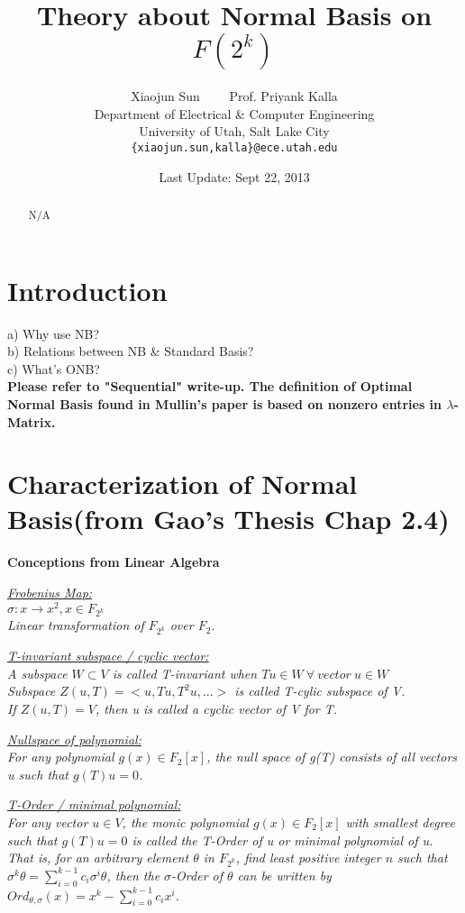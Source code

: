 \documentclass[12pt]{article}
\title{Theory about Normal Basis on $F(2^k)$}
\author{Xiaojun Sun \ \ \ \ Prof. Priyank Kalla\\
\small Department of Electrical \& Computer Engineering\\[-0.8ex]
\small University of Utah, Salt Lake City\\
\small \texttt{\{xiaojun.sun,kalla\}@ece.utah.edu}
}
\date{Last Update: Sept 22, 2013}
\begin{document}
\maketitle

\begin{abstract}
N/A
\end{abstract}

\section{Introduction}

a) Why use NB?\\
b) Relations between NB \& Standard Basis?\\
c) What's ONB?\\
{\bf Please refer to "Sequential" write-up. The definition of Optimal 
Normal Basis found in Mullin's paper is based on nonzero entries in $\lambda$-Matrix.}

\section{Characterization of Normal Basis(from Gao's Thesis Chap 2.4)}
\textbf{Conceptions from Linear Algebra}


\textit{\underline{Frobenius Map:} \\
$\sigma : x \rightarrow x^2, x \in F_{2^k}$ \\
Linear transformation of $F_{2^k}$ over $F_2$. \\
}

\textit{\underline{T-invariant subspace / cyclic vector:} \\
A subspace $W \subset V$ is called T-invariant when $Tu \in W \ \forall \ vector \ u \in W$\\
Subspace $Z(u,T) = <u,Tu,T^2u,...>$ is called T-cylic subspace of V. \\
If $Z(u,T) = V$, then u is called a cyclic vector of V for T.\\
}

\textit{\underline{Nullspace of polynomial:} \\
For any polynomial $g(x) \in F_2[x]$, the null space of g(T) consists of all vectors u such that
$g(T)u = 0$.\\
}

\textit{\underline{T-Order / minimal polynomial:} \\
For any vector $u \in V$, the monic polynomial $g(x) \in F_2[x]$ with smallest degree such that
$g(T)u = 0$ is called the T-Order of u or minimal polynomial of u.\\
That is, for an arbitrary element $\theta$ in $F_{2^k}$, find least positive integer $n$ such that
$\sigma^k\theta = \sum_{i=0}^{k-1} c_i\sigma^i\theta$, then the $\sigma$-Order of $\theta$ can be 
written by $Ord_{\theta,\sigma}(x) = x^k - \sum_{i=0}^{k-1} c_ix^i$. \\
}
\end{document}
